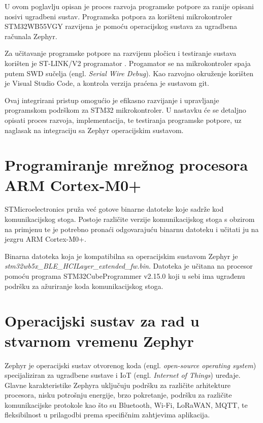 \documentclass[../diplomski_rad.tex]{subfiles}
\begin{document}
\sloppy

\justifying

U ovom poglavlju opisan je proces razvoja programske potpore za ranije opisani nosivi ugradbeni sustav. 
Programska potpora za korišteni mikrokontroler STM32WB55VGY razvijena je pomoću operacijskog sustava 
za ugradbena računala Zephyr.

Za učitavanje programske potpore na razvijenu pločicu i testiranje sustava korišten je ST-LINK/V2 programator \cite{stm32programator}. 
Progamator se na mikrokontroler spaja putem SWD sučelja (engl. \textit{Serial Wire Debug}). 
Kao razvojno okruženje korišten je Visual Studio Code, a kontrola verzija praćena je sustavom git.

Ovaj integrirani pristup omogućio je efikasno razvijanje i upravljanje programskom podrškom za STM32 mikrokontroler. 
U nastavku će se detaljno opisati proces razvoja, implementacija, te testiranja programske potpore, 
uz naglasak na integraciju sa Zephyr operacijskim sustavom.

\section{Programiranje mrežnog procesora ARM Cortex-M0+}

STMicroelectronics pruža već gotove binarne datoteke \cite{kodovi_M0} koje sadrže kod komunikacijskog stoga. 
Postoje različite verzije komunikacijskog stoga s obzirom na primjenu te je potrebno pronaći odgovarajuću 
binarnu datoteku i učitati ju na jezgru ARM Cortex-M0+.

Binarna datoteka koja je kompatibilna sa operacijskim sustavom Zephyr je \textit{stm32wb5x\_BLE\_HCILayer\_extended\_fw.bin}.
Datoteka je učitana na procesor pomoću programa STM32CubeProgrammer v2.15.0 
koji u sebi ima ugrađenu podršku za ažuriranje koda komunikacijskog stoga. 

\section{Operacijski sustav za rad u stvarnom vremenu Zephyr}

Zephyr je operacijski sustav otvorenog koda (engl. \textit{open-source operating system}) specijaliziran za ugradbene sustave 
i IoT (engl. \textit{Internet of Things}) uređaje.
Glavne karakteristike Zephyra uključuju podršku za različite arhitekture procesora, 
nisku potrošnju energije, brzo pokretanje, podršku za različite komunikacijske protokole kao što su 
Bluetooth, Wi-Fi, LoRaWAN, MQTT, te fleksibilnost u prilagodbi prema specifičnim zahtjevima aplikacija.
\end{document}
